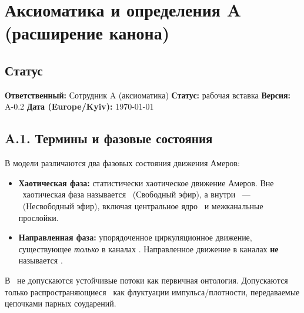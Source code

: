 
\section{Аксиоматика и определения A (расширение канона)}

\subsection*{Статус}
\textbf{Ответственный:} Сотрудник A (аксиоматика) \quad
\textbf{Статус:} рабочая вставка \quad
\textbf{Версия:} A-0.2 \quad
\textbf{Дата (Europe/Kyiv):} \today

\subsection{A.1. Термины и фазовые состояния}

\begin{definition}
В модели различаются два фазовых состояния движения Амеров:
\begin{itemize}
\item \textbf{Хаотическая фаза:} статистически хаотическое движение Амеров.
Вне \EVO\ хаотическая фаза называется \SE\ (Свободный эфир), а внутри \EVO\ — \NE\ (Несвободный эфир),
включая центральное ядро \NY\ и межканальные прослойки.
\item \textbf{Направленная фаза:} упорядоченное циркуляционное движение, существующее \emph{только} в каналах \EVO.
Направленное движение в каналах \textbf{не} называется \NE.
\end{itemize}
\end{definition}

\begin{axiom}
В \SE\ не допускаются устойчивые потоки как первичная онтология.
Допускаются только распространяющиеся \VR\ как флуктуации импульса/плотности,
передаваемые цепочками парных соударений.
\end{axiom}

